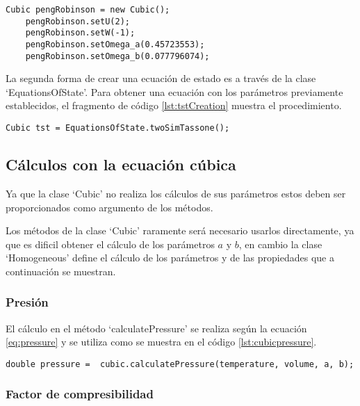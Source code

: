 	\begin{lstlisting}[label={lst:pengRobinsonCreation},caption=Creación de la ecuación de estado de Peng Robinson usando los metodos `Set' de los parametros u y w]
	Cubic pengRobinson = new Cubic();
	pengRobinson.setU(2);
	pengRobinson.setW(-1);
	pengRobinson.setOmega_a(0.45723553);
	pengRobinson.setOmega_b(0.077796074);
	\end{lstlisting}

	La segunda forma de crear una ecuación de estado es a través de la clase `EquationsOfState'. Para obtener una ecuación con los parámetros previamente establecidos, el fragmento de código \ref{lst:tstCreation} muestra el procedimiento.


	\begin{lstlisting}[label=lst:tstCreation,caption=Creación de la ecuación de estado de TST usando la clase `EquationsOfState']
	Cubic tst = EquationsOfState.twoSimTassone();
	\end{lstlisting}

\subsection{Cálculos con la ecuación cúbica}
	Ya que la clase `Cubic' no realiza los cálculos de sus parámetros estos deben ser proporcionados como argumento de los métodos.

	Los métodos de la clase `Cubic' raramente será necesario usarlos directamente, ya que es dificil obtener el cálculo de los parámetros $a$ y $b$, en cambio la clase `Homogeneous' define el cálculo de los parámetros y de las propiedades que a continuación se muestran.

	\subsubsection{Presión}
	El cálculo en el método `calculatePressure' se realiza según la ecuación \ref{eq:pressure} y se utiliza como se muestra en el código \ref{lst:cubicpressure}.
\begin{lstlisting}[label={lst:cubicpressure},caption={Cálculo de presión con una ecuación de estado cúbica, proporcionando como argumento la temperatura, el volumen y los parámetros $a$,$b$}]
	 double pressure =  cubic.calculatePressure(temperature, volume, a, b);
\end{lstlisting}
	\subsubsection{Factor de compresibilidad}

